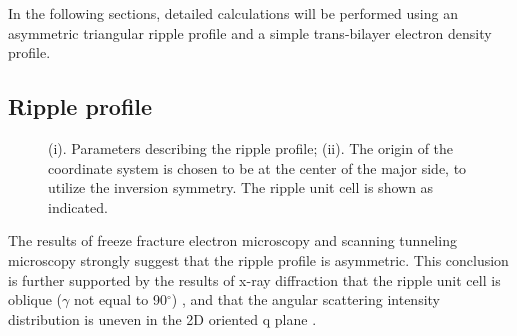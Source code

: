 In the following sections, detailed calculations will be performed using an
asymmetric triangular ripple profile and a simple trans-bilayer electron 
density profile.

\subsection{Ripple profile}
\label{rppl_theory_3}

\begin{figure}
\centerline {}
\vspace{11pt}
\caption{(i). Parameters describing the ripple profile; (ii). 
The origin of the coordinate system is chosen to be at the center
of the major side, to utilize the inversion symmetry. The ripple unit
cell is shown as indicated.
\label{rppl_profile}}
\end{figure}

The results of freeze fracture electron microscopy \cite{Luna77,Cop80,Rup83} 
and scanning tunneling microscopy \cite{Zas88a,Hata93} strongly suggest that 
the ripple profile is asymmetric.  This conclusion is further supported by 
the results of x-ray diffraction that the ripple unit cell is oblique
($\gamma$ not equal to 90$^{\circ}$) 
\cite{Tar73,JanSS79,Ino80,Ale85,Sir88,Wac89a,Kat95}, and that the angular 
scattering intensity distribution is uneven in the 2D oriented q plane
\cite{Ale85,JanSS79}.

